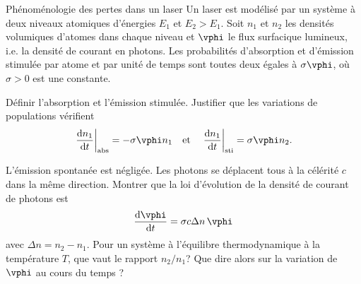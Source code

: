 \begin{exo}[PC][1][TD]{Phénoménologie des pertes dans un laser}
Un laser est modélisé par un système à deux niveaux atomiques d'énergies $E_1$ et $E_2>E_1$. Soit $n_1$ et $n_2$ les densités volumiques d'atomes dans chaque niveau et $\vphi$ le flux surfacique lumineux, i.e. la densité de courant en photons. Les probabilités d'absorption et d'émission stimulée par atome et par unité de temps sont toutes deux égales à $\sigma \vphi$, où $\sigma >0$ est une constante.
%

\begin{quest}
\item Définir l'absorption et l'émission stimulée. Justifier que les variations de populations vérifient
\begin{equation}
\left. \frac{\mathrm{d} n_1}{\mathrm{d} t}\right|_{\text{abs}} = -\sigma \vphi n_1
\quad
\text{et}
\quad
\left.\frac{\mathrm{d} n_1}{\mathrm{d} t}\right|_{\text{sti}}  = \sigma \vphi n_2.
\end{equation}
\item L'émission spontanée est négligée. Les photons se déplacent tous à la célérité $c$ dans la même direction. Montrer que la loi d'évolution de la densité de courant de photons est
\begin{equation}
  \label{eq:vphi_gain}
\frac{\mathrm{d} \vphi}{\mathrm{d} t} = \sigma c \Delta n \,\vphi
\end{equation}
avec $\Delta n=n_2-n_1$.
Pour un système à l'équilibre thermodynamique à la température $T$, que vaut le rapport $n_2/n_1$? Que dire alors sur la variation de $\vphi$ au cours du temps ?
\end{quest}
\end{exo}
